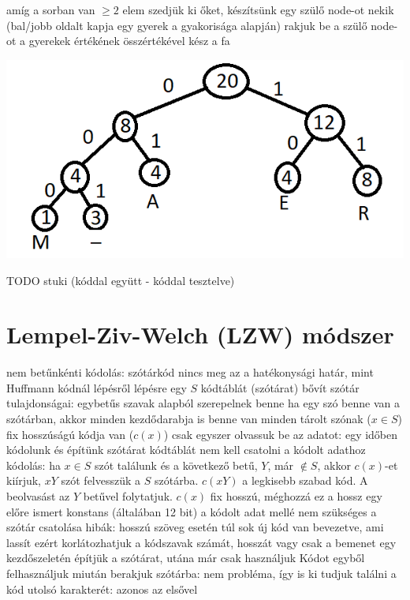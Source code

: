 \documentclass[12pt,a4paper]{article}
\begin{document}
\begin{outline}
	\1 amíg a sorban van $\ge2$ elem
	\2 szedjük ki őket, készítsünk egy szülő node-ot nekik (bal/jobb oldalt kapja egy gyerek a gyakorisága alapján)
	\2 rakjuk be a szülő node-ot a gyerekek értékének összértékével
	\1 kész a fa
\end{outline}

\includegraphics[width=0.7\linewidth]{huffman-code-tree}

TODO stuki (kóddal együtt - kóddal tesztelve)

\pagebreak

\section{Lempel-Ziv-Welch (LZW) módszer}

\begin{outline}
	\1 nem betűnkénti kódolás: szótárkód
		\2 nincs meg az a hatékonysági határ, mint Huffmann kódnál
	\1 lépésről lépésre egy $S$ kódtáblát (szótárat) bővít
	\1 szótár tulajdonságai:
		\2 egybetűs szavak alapból szerepelnek benne
		\2 ha egy szó benne van a szótárban, akkor minden kezdődarabja is benne van
		\2 minden tárolt szónak ($x \in S$) fix hosszúságú kódja van ($c(x)$)
	\1 csak egyszer olvassuk be az adatot: egy időben kódolunk és építünk szótárat
	\1 kódtáblát nem kell csatolni a kódolt adathoz
	\1 kódolás: ha $x \in S$ szót találunk és a következő betű, $Y$, már $\notin S$,
	akkor $c(x)$-et kiírjuk, $xY$ szót felvesszük a $S$ szótárba. $c(xY)$ a legkisebb szabad kód.
	A beolvasást az $Y$ betűvel folytatjuk.
	\1 $c(x)$ fix hosszú, méghozzá ez a hossz egy előre ismert konstans (általában 12 bit)
	\1 a kódolt adat mellé nem szükséges a szótár csatolása
	\1 hibák:
		\2 hosszú szöveg esetén túl sok új kód van bevezetve, ami lassít
		\2 ezért korlátozhatjuk a kódszavak számát, hosszát
		\2 vagy csak a bemenet egy kezdőszeletén építjük a szótárat, utána már csak használjuk
	\1 Kódot egyből felhasználjuk miután berakjuk szótárba:
	nem probléma, így is ki tudjuk találni a kód utolsó karakterét: azonos az elsővel
\end{outline}
\end{document}
